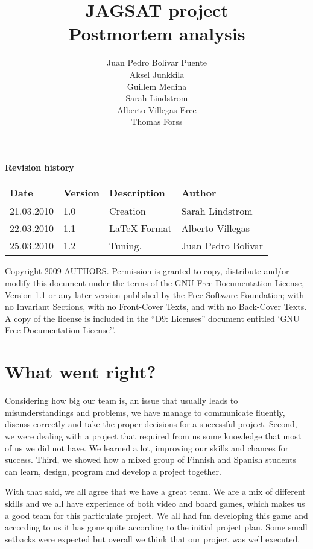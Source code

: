 \documentclass[12pt,a4paper]{article}
\title{\large JAGSAT project\\\huge Postmortem analysis}
\author{
  Juan Pedro Bolívar Puente\\ 
  Aksel Junkkila\\
  Guillem Medina\\ 
  Sarah Lindstrom\\ 
  Alberto Villegas Erce\\ 
  Thomas Forss
}
\begin{document}
\maketitle

\begin{center}
\textbf {Revision history}

\begin{tabular}{ l | l | l | l }
Date			&Version	&Description		&Author\\\hline\hline
21.03.2010	&1.0		&Creation 		&Sarah Lindstrom\\
22.03.2010	&1.1		&LaTeX Format	&Alberto Villegas\\
25.03.2010	&1.2		&Tuning.	&Juan Pedro Bolivar
\end{tabular}
\label{tab:rev}
\end{center}

\vfill
Copyright 2009 AUTHORS.
Permission is granted to copy, distribute and/or modify this document under the terms of the GNU Free Documentation License, Version 1.1 or any later version published by the Free Software Foundation;  with no Invariant Sections, with no Front-Cover Texts, and with no Back-Cover Texts. A copy of the license is included in the ``D9: Licenses''  document entitled `GNU Free Documentation License''.

\pagebreak
\tableofcontents
\pagebreak

\section{What went right?}

Considering how big our team is, an issue that usually leads to
misunderstandings and problems, we have manage to communicate
fluently, discuss correctly and take the proper decisions for a
successful project. Second, we were dealing with a project that
required from us some knowledge that most of us we did not have. We
learned a lot, improving our skills and chances for success.  Third,
we showed how a mixed group of Finnish and Spanish students can learn,
design, program and develop a project together.

With that said, we all agree that we have a great team. We are a mix
of different skills and we all have experience of both video and board
games, which makes us a good team for this particulate project. We all
had fun developing this game and according to us it has gone quite
according to the initial project plan. Some small setbacks were
expected but overall we think that our project was well executed.
\end{document}
